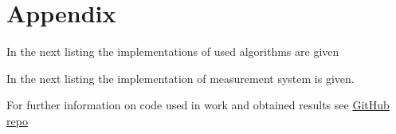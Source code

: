 \section*{Appendix}

In the next listing the implementations of used algorithms are given



In the next listing the implementation of measurement system is given.



For further information on code used in work and obtained results see \href{https://github.com/RyazMax/ITMO_Algorithms/tree/main/LR1}{GitHub repo}